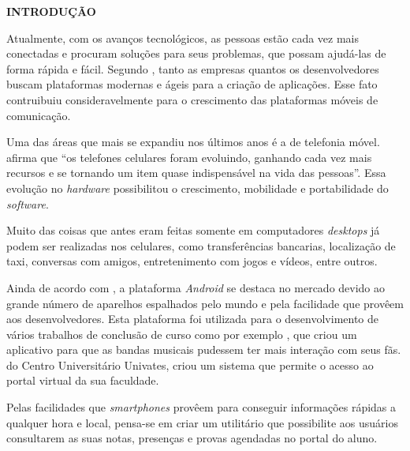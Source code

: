   \vspace{1.2em}
  \textbf{\large INTRODUÇÃO}
  \vspace{2.9em}
\thispagestyle{empty}


	\par Atualmente, com os avanços tecnológicos, as pessoas estão cada vez mais
conectadas e procuram soluções para seus problemas, que possam ajudá-las de
forma rápida e fácil. Segundo , tanto as empresas
quantos os desenvolvedores buscam plataformas modernas e ágeis para a criação
de aplicações. Esse fato contruibuiu consideravelmente para o crescimento das
plataformas móveis de comunicação.

	\par Uma das áreas que mais se expandiu nos últimos anos é a de telefonia
móvel.  afirma que “os telefones celulares
foram evoluindo, ganhando cada vez mais recursos e se tornando um item quase
indispensável na vida das pessoas”. Essa evolução no \textit{hardware}
possibilitou o crescimento, mobilidade e portabilidade do \textit{software}.

	\par Muito das coisas que antes eram feitas somente em computadores
\textit{desktops} já podem ser realizadas nos celulares, como transferências
bancarias, localização de taxi, conversas com amigos, entretenimento com jogos
e vídeos, entre outros.

	\par Ainda de acordo com , a plataforma
\textit{Android} se destaca no mercado devido ao grande número de aparelhos
espalhados pelo mundo e pela facilidade que provêem aos desenvolvedores. Esta
plataforma foi utilizada para o desenvolvimento de vários trabalhos de
conclusão de curso como por exemplo , que criou um
aplicativo para que as bandas musicais pudessem ter mais interação com seus
fãs.  do Centro Universitário Univates, criou um sistema
que permite o acesso ao portal virtual da sua faculdade.

	\par Pelas facilidades que \textit{smartphones} provêem para conseguir
informações rápidas a qualquer hora e local, pensa-se em criar um utilitário
que possibilite aos usuários consultarem as suas notas, presenças e provas
agendadas no portal do aluno.

